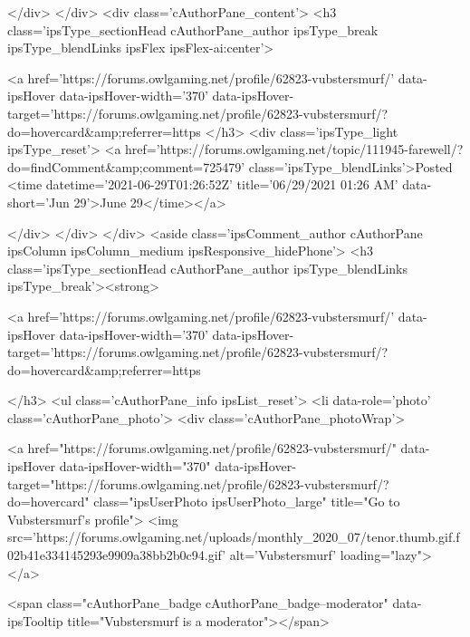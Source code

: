			</div>
		</div>
		<div class='cAuthorPane_content'>
			<h3 class='ipsType_sectionHead cAuthorPane_author ipsType_break ipsType_blendLinks ipsFlex ipsFlex-ai:center'>
				


<a href='https://forums.owlgaming.net/profile/62823-vubstersmurf/' data-ipsHover data-ipsHover-width='370' data-ipsHover-target='https://forums.owlgaming.net/profile/62823-vubstersmurf/?do=hovercard&amp;referrer=https%
			</h3>
			<div class='ipsType_light ipsType_reset'>
				<a href='https://forums.owlgaming.net/topic/111945-farewell/?do=findComment&amp;comment=725479' class='ipsType_blendLinks'>Posted <time datetime='2021-06-29T01:26:52Z' title='06/29/2021 01:26  AM' data-short='Jun 29'>June 29</time></a>
				
			</div>
		</div>
	</div>
	<aside class='ipsComment_author cAuthorPane ipsColumn ipsColumn_medium ipsResponsive_hidePhone'>
		<h3 class='ipsType_sectionHead cAuthorPane_author ipsType_blendLinks ipsType_break'><strong>


<a href='https://forums.owlgaming.net/profile/62823-vubstersmurf/' data-ipsHover data-ipsHover-width='370' data-ipsHover-target='https://forums.owlgaming.net/profile/62823-vubstersmurf/?do=hovercard&amp;referrer=https%
			
		</h3>
		<ul class='cAuthorPane_info ipsList_reset'>
			<li data-role='photo' class='cAuthorPane_photo'>
				<div class='cAuthorPane_photoWrap'>
					


	<a href="https://forums.owlgaming.net/profile/62823-vubstersmurf/" data-ipsHover data-ipsHover-width="370" data-ipsHover-target="https://forums.owlgaming.net/profile/62823-vubstersmurf/?do=hovercard" class="ipsUserPhoto ipsUserPhoto_large" title="Go to Vubstersmurf's profile">
		<img src='https://forums.owlgaming.net/uploads/monthly_2020_07/tenor.thumb.gif.f02b41e334145293e9909a38bb2b0c94.gif' alt='Vubstersmurf' loading="lazy">
	</a>

					
						<span class="cAuthorPane_badge cAuthorPane_badge--moderator" data-ipsTooltip title="Vubstersmurf is a moderator"></span>
					
					
						
